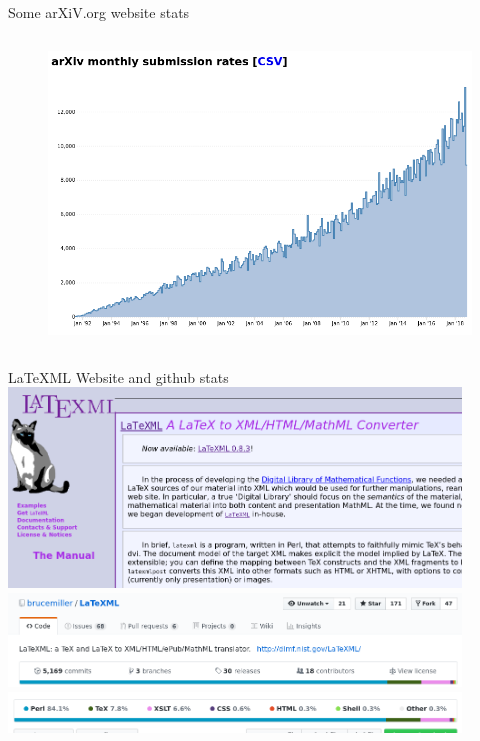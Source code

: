 \documentclass[9pt]{beamer}
\begin{document}
\begin{frame}{Some arXiV.org website stats}
\begin{columns}[T]
\begin{column}{0.5\textwidth}
\begin{figure}[h]
    \includegraphics[width=\textwidth]{subm_rates.png} 
            \end{figure}
			\end{column}
			\end{columns}
\end{frame}

\begin{frame}{LaTeXML Website and github stats}
    \includegraphics[width=0.9\textwidth]{ltxml_website.png}
    \includegraphics[width=0.9\textwidth]{ltxml_github1.png}
    \includegraphics[width=0.9\textwidth]{ltxml_github2.png}
\end{frame}
\end{document}
